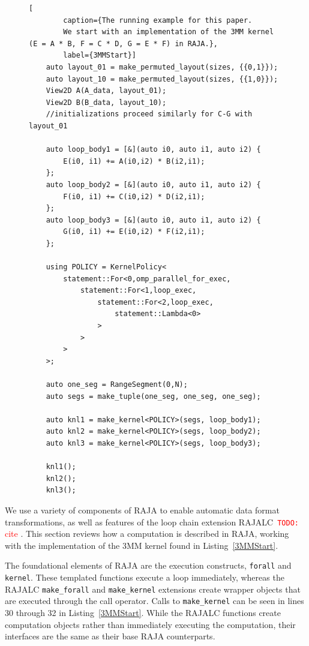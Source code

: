 \documentclass[sigconf, table]{acmart}
\newcommand{\todo}[1]{{\textcolor{red}{{\tt{TODO:}}\,\,#1 }}}
\begin{document}
\begin{figure}
	\begin{lstlisting}[
		caption={The running example for this paper. 
		We start with an implementation of the 3MM kernel (E = A * B, F = C * D, G = E * F) in RAJA.},
		label={3MMStart}]
	auto layout_01 = make_permuted_layout(sizes, {{0,1}});
	auto layout_10 = make_permuted_layout(sizes, {{1,0}});
	View2D A(A_data, layout_01);
	View2D B(B_data, layout_10);
	//initializations proceed similarly for C-G with layout_01

	auto loop_body1 = [&](auto i0, auto i1, auto i2) {
		E(i0, i1) += A(i0,i2) * B(i2,i1);
	};
	auto loop_body2 = [&](auto i0, auto i1, auto i2) {
		F(i0, i1) += C(i0,i2) * D(i2,i1);
	};
	auto loop_body3 = [&](auto i0, auto i1, auto i2) {
		G(i0, i1) += E(i0,i2) * F(i2,i1);
	};
	
	using POLICY = KernelPolicy<
		statement::For<0,omp_parallel_for_exec,
			statement::For<1,loop_exec,
				statement::For<2,loop_exec,
					statement::Lambda<0>
				>
			>
		>
	>;

	auto one_seg = RangeSegment(0,N);
	auto segs = make_tuple(one_seg, one_seg, one_seg);

	auto knl1 = make_kernel<POLICY>(segs, loop_body1);
	auto knl2 = make_kernel<POLICY>(segs, loop_body2);
	auto knl3 = make_kernel<POLICY>(segs, loop_body3);

	knl1();
	knl2();
	knl3();
	\end{lstlisting}
\end{figure}


We use a variety of components of RAJA to enable automatic data format transformations, as well as features of the loop chain extension RAJALC~\todo{cite}. 
This section reviews how a computation is described in RAJA, working with the implementation of the 3MM kernel found in Listing~\ref{3MMStart}.

The foundational elements of RAJA are the execution constructs, \verb.forall. and \verb.kernel.. 
These templated functions execute a loop immediately, whereas the RAJALC \verb.make_forall. and \verb.make_kernel. extensions create wrapper objects that are executed through the call operator. 
Calls to \verb.make_kernel. can be seen in lines 30 through 32 in Listing~\ref{3MMStart}. 
While the RAJALC functions create computation objects rather than immediately executing the computation, their interfaces are the same as their base RAJA counterparts.
\end{document}
